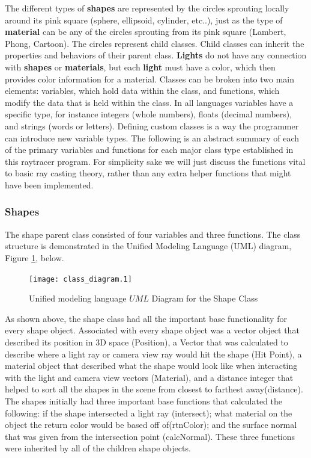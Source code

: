 The different types of \textbf{shapes} are represented by the circles sprouting locally around its pink square (sphere, ellipsoid, cylinder, etc..), just as the type of \textbf{material} can be any of the circles sprouting from its pink square (Lambert, Phong, Cartoon).  The circles represent child classes.  Child classes can inherit the properties and behaviors of their parent class. \textbf{Lights} do not have any connection with \textbf{shapes} or \textbf{materials}, but each \textbf{light} must have a color, which then provides color information for a material.  Classes can be broken into two main elements: variables, which hold data within the class, and functions, which modify the data that is held within the class.  In all languages variables have a specific type, for instance integers (whole numbers), floats (decimal numbers), and strings (words or letters).  Defining custom classes is a way the programmer can introduce new variable types. The following is an abstract summary of each of the primary variables and functions for each major class type established in this raytracer program. For simplicity sake we will just discuss the functions vital to basic ray casting theory, rather than any extra helper functions that might have been implemented.
\subsubsection{Shapes}
The shape parent class consisted of four variables and three functions. The class structure is demonstrated in the Unified Modeling Language (UML) diagram, Figure \ref{uml:shapeclass}, below.

\begin{figure}[ht]

\centering
\texttt{[image: class\_diagram.1]}
\caption{Unified modeling language \(UML\) Diagram for the Shape Class}
\label{uml:shapeclass}
\end{figure}

As shown above, the shape class had all the important base functionality for every shape object.  Associated with every shape object was a vector object that described its position in 3D space (Position), a Vector that was calculated to describe where a light ray or camera view ray would hit the shape (Hit Point), a material object that described what the shape would look like when interacting with the light and camera view vectors (Material), and a distance integer that helped to sort all the shapes in the scene from closest to farthest away(distance).  The shapes initially had three important base functions that calculated the following: if the shape intersected a light ray (intersect); what material on the object the return color would be based off of(rtnColor); and the surface normal that was given from the intersection point (calcNormal).  These three functions were inherited by all of the children shape objects.

